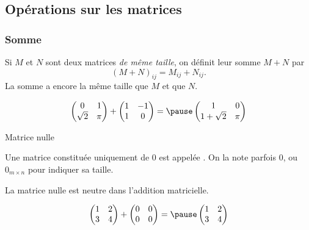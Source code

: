 \subsection{Opérations sur les matrices}
\subsubsection{Somme}
\begin{frame}
  \begin{definition}
    Si \(M\) et \(N\) sont deux matrices \emph{de même taille}\pause{}, on définit leur somme \(M+N\) par\pause{}
    \begin{equation*}
      {(M+N)}_{ij} = M_{ij} + N_{ij}.
    \end{equation*}\pause{}
    La somme a encore la même taille que \(M\) et que \(N\).
  \end{definition}\pause{}
  \begin{example}
    \begin{equation*}
      \begin{pmatrix}
        0 & 1 \\ \sqrt 2 & \pi
      \end{pmatrix}
      +
      \begin{pmatrix}
        1 & -1 \\ 1 & 0
      \end{pmatrix}
      = \pause
      \begin{pmatrix}
        1 & 0 \\ 1 + \sqrt 2 & \pi
      \end{pmatrix}
    \end{equation*}
  \end{example}
\end{frame}
\begin{frame}{Matrice nulle}
  \begin{definition}
  Une matrice constituée uniquement de \(0\) est appelée .\pause{} On la note parfois \(0\), ou \(0_{m\times n}\) pour indiquer sa taille.
\end{definition}\pause{}
  \begin{proposition}
    La matrice nulle est neutre dans l'addition matricielle.
  \end{proposition}\pause{}
  \begin{equation*}
    \begin{pmatrix}
      1 & 2\\ 3 & 4
    \end{pmatrix}
    +
    \begin{pmatrix}
      0&0\\0&0
    \end{pmatrix}=\pause
    \begin{pmatrix}
      1 & 2\\ 3 & 4
    \end{pmatrix}
  \end{equation*}
\end{frame}
